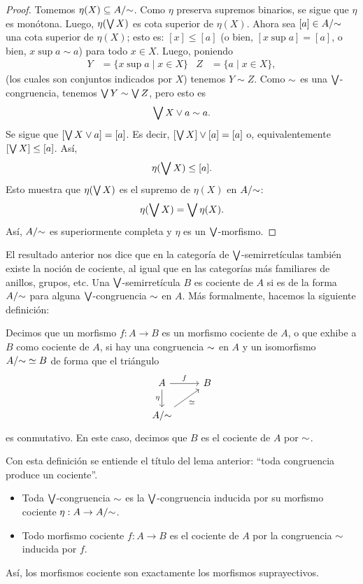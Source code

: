 \begin{proof}
  Tomemos $\eta(X)\subseteq A/{\sim}$.
  Como $\eta$ preserva supremos binarios,
  se sigue que $\eta$ es monótona.
  Luego, $\eta(\bigvee X)$ es cota superior de $\eta(X)$.
  Ahora sea $[a]\in A/{\sim}$ una cota superior de $\eta(X)$;
  esto es: $[x]\leq[a]$
  (o bien, $[x\sup a]=[a]$, o bien, $x\sup a\sim a$)
  para todo $x\in X$.
  Luego, poniendo
  \begin{align*}
      Y &= \{x\sup a\mid x\in X\}
      &
      Z &=\{a\mid x\in X\},
  \end{align*}
  (los cuales son conjuntos indicados por $X$)
  tenemos $Y\sim Z$.
  Como ${\sim}$ es una $\bigvee$-congruencia, tenemos
  $\bigvee Y\sim\bigvee Z$, pero esto es
  \[
      \bigvee X\vee a\sim a
  .\]
  Se sigue que $[\bigvee X\vee a]=[a]$. Es decir, $[\bigvee
  X]\vee[a]=[a]$ o, equivalentemente $[\bigvee X]\leq[a]$.
  Así,
  \[
      \eta(\bigvee X)\leq [a]
  .\]
  Esto muestra que $\eta(\bigvee X)$ es el supremo de $\eta(X)$
  en $A/{\sim}$:
  \[
    \eta(\bigvee X) = \bigvee \eta(X)
  .\]
  Así, $A/{\sim}$ es superiormente completa y
  $\eta$ es un $\bigvee$-morfismo.
\end{proof}

El resultado anterior nos dice que en la
categoría de $\bigvee$-semirretículas también existe la noción de
cociente, al igual que en las categorías más familiares de
anillos, grupos, etc. Una $\bigvee$-semirretícula $B$ es cociente de
$A$ si es de la forma $A/{\sim}$ para alguna $\bigvee$-congruencia
${\sim}$ en $A$. Más formalmente, hacemos la siguiente definición:
\begin{defn}
  Decimos que un morfismo $f:A\to B$ es un morfismo cociente de
  $A$, o que exhibe a $B$ como cociente de $A$, si hay una
  congruencia ${\sim}$ en $A$ y un isomorfismo $A/{\sim}\simeq B$
  de forma que el triángulo
  \[
    \begin{tikzcd}
      A \ar[d,"\eta"'] \ar[r,"f"] & B \\
      A/\simr \ar[ur,"\simeq"']
    \end{tikzcd}
  \]
  es conmutativo.
  En este caso, decimos que $B$ es el cociente de $A$ por
  ${\sim}$.
\end{defn}
Con esta definición se entiende el título del lema anterior:
``toda congruencia produce un cociente''.

\begin{obs}
\leavevmode
  \begin{itemize}
    \item
    Toda $\bigvee$-congruencia ${\sim}$ es la $\bigvee$-congruencia
    inducida por su morfismo cociente $\eta:A\to A/{\sim}$.
    \item
    Todo morfismo cociente $f:A\to B$ es el cociente de $A$ por la
    congruencia ${\sim}$ inducida por $f$.
  \end{itemize}
\end{obs}
Así, los morfismos cociente son exactamente los
morfismos suprayectivos.

